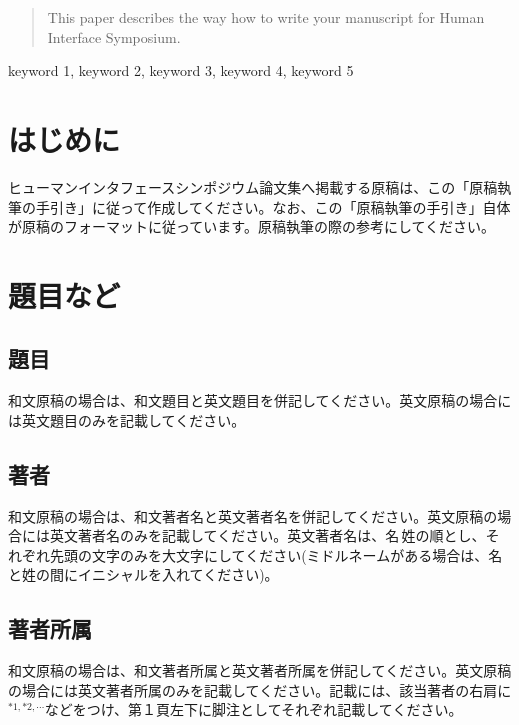 \documentclass{hissymp}
\begin{document}

\begin{abstract}
This paper describes the way how to write your manuscript for Human Interface Symposium.
\end{abstract}

\begin{keyword}	
keyword 1, keyword 2, keyword 3, keyword 4, keyword 5
\end{keyword}

\maketitle	

\section{はじめに}
ヒューマンインタフェースシンポジウム論文集へ掲載する原稿は、この「原稿執筆の手引き」に従って作成してください。なお、この「原稿執筆の手引き」自体が原稿のフォーマットに従っています。原稿執筆の際の参考にしてください。


\section{題目など}

\subsection{題目}
和文原稿の場合は、和文題目と英文題目を併記してください。英文原稿の場合には英文題目のみを記載してください。

\subsection{著者}
和文原稿の場合は、和文著者名と英文著者名を併記してください。英文原稿の場合には英文著者名のみを記載してください。英文著者名は、名\,姓の順とし、それぞれ先頭の文字のみを大文字にしてください(ミドルネームがある場合は、名と姓の間にイニシャルを入れてください)。

\subsection{著者所属}
和文原稿の場合は、和文著者所属と英文著者所属を併記してください。英文原稿の場合には英文著者所属のみを記載してください。記載には、該当著者の右肩に$^ {*1,*2,\cdots}$などをつけ、第１頁左下に脚注としてそれぞれ記載してください。
\end{document}

